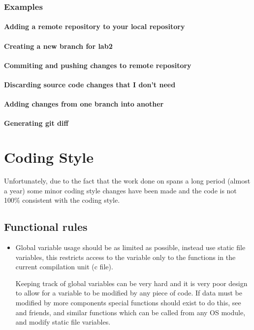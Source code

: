 \begin{appendices}
\subsection{Examples}
\subsubsection{Adding a remote repository to your local repository}
\subsubsection{Creating a new branch for lab2}
\subsubsection{Commiting and pushing changes to remote repository}
\subsubsection{Discarding source code changes that I don't need}
\subsubsection{Adding changes from one branch into another}
\subsubsection{Generating git diff}

\chapter{Coding Style}

Unfortunately, due to the fact that the work done on \projectname spans a long period (almost a
year) some minor coding style changes have been made and the code is not 100\% consistent with the
coding style.

\section{Functional rules}
\begin{itemize}
	\item Global variable usage should be as limited as possible, instead use static file variables,
this restricts access to the variable only to the functions in the current compilation unit (c file).

	Keeping track of global variables can be very hard and it is very poor design to allow for a
variable to be modified by any piece of code. If data must be modified by more components special
functions should exist to do this, see  and friends, 
and similar functions which can be called from any OS module, and modify static file variables.


\end{itemize}
\end{appendices}
